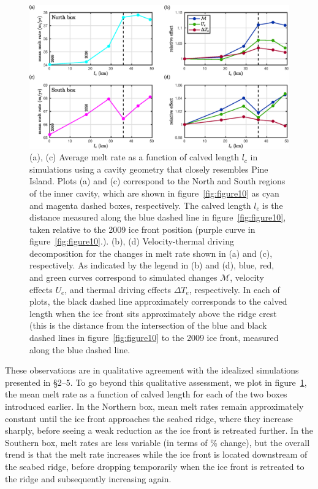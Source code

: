 \documentclass[draft]{agujournal2019}
\begin{document}
\begin{figure}
    \centering
    \includegraphics[width = \textwidth]{../make_figures/plots/figure12.eps}
    \caption{(a), (c) Average melt rate as a function of calved length $l_c$ in simulations using a cavity geometry that closely resembles Pine Island. Plots (a) and (c) correspond to the North and South regions of the inner cavity, which are shown in figure~\ref{fig:figure10} as cyan and magenta dashed boxes, respectively. The calved length $l_c$ is the distance measured along the blue dashed line in figure~\ref{fig:figure10}, taken relative to the 2009 ice front position (purple curve in figure~\ref{fig:figure10}.). (b), (d) Velocity-thermal driving decomposition for the changes in melt rate shown in (a) and (c), respectively. As indicated by the legend in (b) and (d), blue, red, and green curves correspond to simulated changes $\mathcal{M}$, velocity effects $U_e$, and thermal driving effects $\Delta T_e$, respectively. In each of  plots, the black dashed line approximately corresponds to the calved length when the ice front sits approximately above the ridge crest (this is the distance from the intersection of the blue and black dashed lines in figure~\ref{fig:figure10} to the 2009 ice front, measured along the blue dashed line.}\label{fig:figure12}
\end{figure}

 These observations are in qualitative agreement with the idealized simulations presented in \S2--5. To go beyond this qualitative assessment, we plot in figure~\ref{fig:figure12}, the mean melt rate as a function of calved length for each of the two boxes introduced earlier. In the Northern box, mean melt rates remain approximately constant until the ice front approaches the seabed ridge, where they increase sharply, before seeing a weak reduction as the ice front is retreated further. In the Southern box, melt rates are less variable (in terms of \% change), but the overall trend is that the melt rate increases while the ice front is located downstream of the seabed ridge, before dropping temporarily when the ice front is retreated to the ridge and subsequently increasing again. 
 
\end{document}
